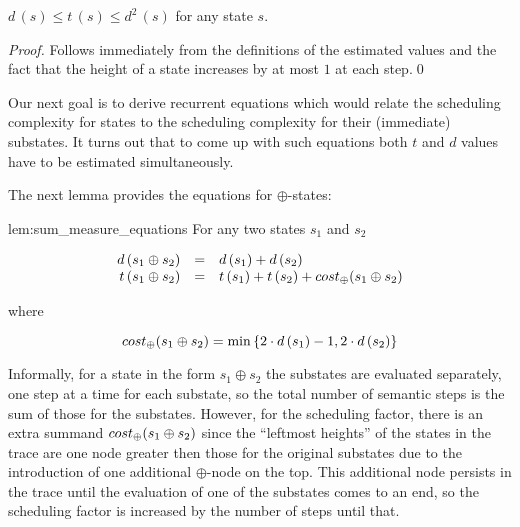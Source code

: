 \begin{lemma} $d\,(s) \le t\,(s) \le d^2\,(s)$ for any state $s$.
  
\end{lemma}
\begin{proof}
  Follows immediately from the definitions of the estimated values and the fact that the height of a state increases by at most $1$ at each step.\qed
\end{proof}

Our next goal is to derive recurrent equations which would relate the scheduling complexity for states to the scheduling complexity for their
(immediate) substates. It turns out that to come up with such equations both $t$ and $d$ values have to be estimated simultaneously.  




The next lemma provides the equations for $\oplus$-states:

\begin{replemma}{lem:sum_measure_equations}
For any two states $s_1$ and $s_2$

\[
\begin{array}{rcl}
  d\,(s_1 \oplus s_2) &=& d\,(s_1) + d\,(s_2) \\
    t\,(s_1 \oplus s_2) &=& t\,(s_1) + t\,(s_2) + cost_{\oplus}(s_1 \oplus s_2)
\end{array}
\]

where

\[ cost_{\oplus}(s_1 \oplus s_2) = \min\,\{2\cdot d\,(s_1) - 1, 2\cdot d\,(s_2)\} \] 
\end{replemma}

Informally, for a state in the form $s_1 \oplus s_2$ the substates are evaluated separately, one step at a time for
each substate, so the total number of semantic steps is the sum of those for the substates. However, for the scheduling factor, 
there is an extra summand $cost_{\oplus}(s_1 \oplus s_2)$ since the ``leftmost heights'' of the states in the trace are one node greater then those for the
original substates due to the introduction of one additional $\oplus$-node on the top. This additional node persists in the trace until the evaluation
of one of the substates comes to an end, so the scheduling factor is increased by the number of steps until that.

